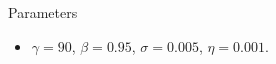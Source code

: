 \documentclass[aspectratio=169,10pt]{beamer}
\begin{document}
\begin{frame}
	
	\renewcommand{\arraystretch}{1.2}
	
	\begin{table}[h!]
		\caption{Nonlinear Model Performance}\vspace{-0.1in}
		\begin{center}
		\end{center}
	\end{table}
	
	\renewcommand{\arraystretch}{1.0}
	
\end{frame}	

\begin{frame}{Parameters}
	\begin{itemize}
		\item $\gamma = 90$, $\beta = 0.95$, $\sigma = 0.005$, $\eta = 0.001$.
	\end{itemize}
\end{frame}
\end{document}
